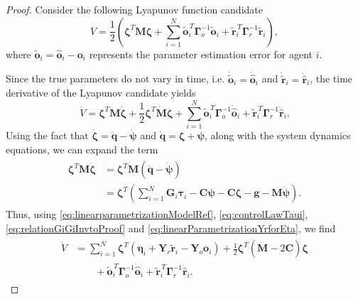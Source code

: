 \begin{proof}
    Consider the following Lyapunov function candidate
    \begin{equation}
        V = \frac{1}{2}\left( \boldsymbol{\zeta}^T \mathbf {M} \boldsymbol{\zeta} + \sum _{i=1}^{N} \widetilde{\mathbf{o}}_i^{\,T} \boldsymbol{\Gamma }_o^{-1}\widetilde{\mathbf{o}}_i + \widetilde{\mathbf{r}}_i^{\,T} \boldsymbol{\Gamma }_r^{-1} \widetilde{\mathbf{r}}_i \right),
    \end{equation}
    where $\widetilde{\mathbf {o}}_i = \hat{\mathbf{o}}_i - \mathbf{o}_i$ represents the parameter estimation error for agent $i$.

    Since the true parameters do not vary in time, i.e. $\dot{\widetilde{\mathbf {o}}}_i = \dot{\hat{\mathbf{o}}}_i$ and $\dot{\widetilde{\mathbf {r}}}_i = \dot{\hat{\mathbf{r}}}_i$, the time derivative of the Lyapunov candidate yields
    \begin{equation}
        \dot{V} = \boldsymbol{\zeta}^T \mathbf{M} \dot{\boldsymbol{\zeta}} + \frac{1}{2} \boldsymbol{\zeta}^T \dot{\mathbf{M}} \boldsymbol{\zeta} + \sum\limits_{i=1}^{N} \widetilde{\mathbf{o}}_i^{\,T} \boldsymbol{\Gamma}_o^{-1} \dot{\hat{\mathbf{o}}}_i + \widetilde{\mathbf{r}}_i^{\,T} \boldsymbol{\Gamma}_r^{-1}\dot{\hat{\mathbf{r}}}_i.
    \end{equation}
    Using the fact that $\dot{\boldsymbol{\zeta}} = \ddot{\mathbf{q}} - \dot{\boldsymbol{\psi}}$ and $\dot{\mathbf{q}} = \boldsymbol{\zeta} + \boldsymbol{\psi}$, along with the system dynamics equations, we can expand the term
    \begin{align} 
    \begin{split}
        \boldsymbol{\zeta}^T \mathbf {M} \dot{\boldsymbol{\zeta}} &= \boldsymbol{\zeta}^T\mathbf{M}(\ddot{\mathbf{q}} - \dot{\boldsymbol{\psi}})\\ 
        &= \boldsymbol{\zeta}^T\left(\textstyle \sum\limits_{i=1}^{N} \mathbf{G}_i\boldsymbol{\tau }_i - \mathbf{C}\boldsymbol{\psi} - \mathbf{C} \boldsymbol{\zeta} - \mathbf{g} - \mathbf{M}\dot{\boldsymbol{\psi}}\right).
    \end{split}
    \end{align} 
    Thus, using \eqref{eq:linearparametrizationModelRef}, \eqref{eq:controlLawTaui}, \eqref{eq:relationGiGiInvtoProof} and \eqref{eq:linearParametrizationYrforEta}, we find
    \begin{align}
    \begin{split}
        \dot{V} &= \sum\limits_{i=1}^{N} \boldsymbol{\zeta}^T\left(\boldsymbol{\eta}_i + \mathbf {Y}_r \widetilde{\mathbf {r}}_i - \mathbf {Y}_o \mathbf {o}_i\right) + \frac{1}{2}\boldsymbol{\zeta}^T\left(\dot{\mathbf {M}}-2\mathbf {C}\right)\boldsymbol{\zeta} \!\\ &\quad \quad + \widetilde{\mathbf {o}}_i^{\,T} \boldsymbol{\Gamma }_o^{-1} \dot{\hat{\mathbf {o}}}_i + \widetilde{\mathbf {r}}_i^{\,T} \boldsymbol{\Gamma }_r^{-1}\dot{\hat{\mathbf {r}}}_i. 

\end{split}
\end{align}
\end{proof}
